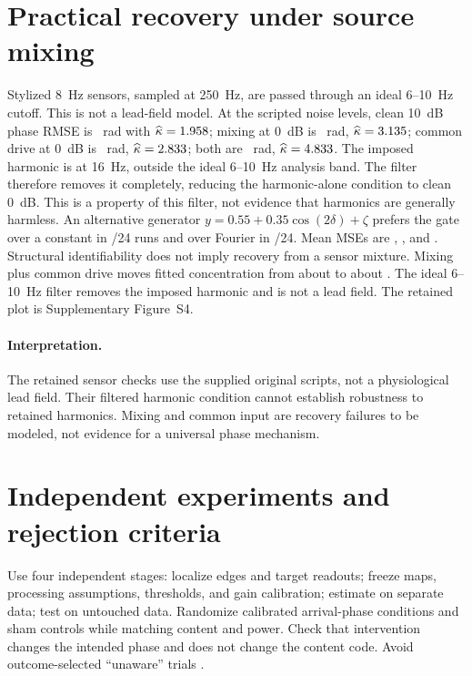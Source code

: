 \documentclass[submission,nolinenumbers]{esj}
\begin{document}
\section{Practical recovery under source mixing}\label{sec:practical}
Stylized 8~Hz sensors, sampled at 250~Hz, are passed through an ideal 6--10~Hz cutoff. This is not a lead-field model. At the scripted noise levels, clean 10~dB phase RMSE is \CleanTenRmse{}~rad with $\widehat\kappa=1.958$; mixing at 0~dB is \MixZeroRmse{}~rad, $\widehat\kappa=3.135$; common drive at 0~dB is \DriveZeroRmse{}~rad, $\widehat\kappa=2.833$; both are \MixdriveZeroRmse{}~rad, $\widehat\kappa=4.833$. The imposed harmonic is at 16~Hz, outside the ideal 6--10~Hz analysis band. The filter therefore removes it completely, reducing the harmonic-alone condition to clean 0~dB. This is a property of this filter, not evidence that harmonics are generally harmless. An alternative generator $y=0.55+0.35\cos(2\delta)+\zeta$ prefers the gate over a constant in \FalseConst/24 runs and over Fourier in \FalseFourier/24. Mean MSEs are \AltGate{}, \AltConst{}, and \AltFourier{}. Structural identifiability does not imply recovery from a sensor mixture. Mixing plus common drive moves fitted concentration from about \CleanTenKappa{} to about \MixdriveZeroKappa{}. The ideal 6--10~Hz filter removes the imposed harmonic and is not a lead field. The retained plot is Supplementary Figure~S4.

\paragraph{Interpretation.} The retained sensor checks use the supplied original scripts, not a physiological lead field. Their filtered harmonic condition cannot establish robustness to retained harmonics. Mixing and common input are recovery failures to be modeled, not evidence for a universal phase mechanism.

\section{Independent experiments and rejection criteria}\label{sec:experiment}
Use four independent stages: localize edges and target readouts; freeze maps, processing assumptions, thresholds, and gain calibration; estimate on separate data; test on untouched data. Randomize calibrated arrival-phase conditions and sham controls while matching content and power. Check that intervention changes the intended phase and does not change the content code. Avoid outcome-selected ``unaware'' trials \citep{shanks2017}.
\end{document}
